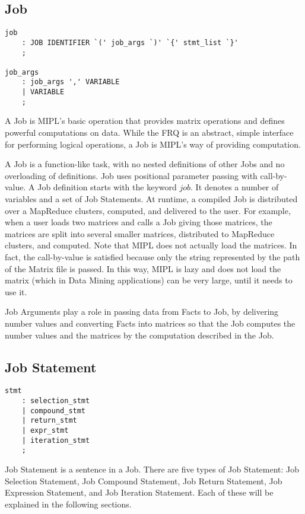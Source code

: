 \documentclass[prodmode,acmtecs]{acmsmall}
\begin{document}
\subsection{Job}

\begin{lstlisting}
job
	: JOB IDENTIFIER `(' job_args `)' `{' stmt_list `}'
	;

job_args
	: job_args ',' VARIABLE
	| VARIABLE
	;
\end{lstlisting}

\label{Job_Section}
A Job is MIPL's basic operation that provides matrix operations and 
defines powerful computations on data. While the FRQ is an abstract,
simple interface for performing logical operations, a Job is MIPL's 
way of providing computation.

A Job is a function-like task, with no nested definitions of other Jobs and no
overloading of definitions. Job uses 
positional parameter passing with call-by-value.  A Job
definition starts with the keyword $job$. It denotes a number of variables and a set of Job
Statements.  At runtime, a compiled Job is distributed over
a MapReduce clusters, computed, and delivered to the user. For
example, when a user loads two matrices and calls a Job giving those
matrices, the matrices are split into several smaller matrices,
distributed to MapReduce clusters, and computed. Note that MIPL does not
actually load the matrices. In fact, the call-by-value is satisfied because 
only the string represented by the path of the Matrix file is passed. In this 
way, MIPL is lazy and does not load the matrix (which in Data Mining applications) 
can be very large, until it needs to use it.

Job Arguments play a role in passing data from Facts to Job, by
delivering number values and converting Facts into matrices
so that the Job computes the number values and the matrices by
the computation described in the Job.
\medskip

\subsection{Job Statement}

\begin{lstlisting}
stmt
	: selection_stmt
	| compound_stmt
	| return_stmt
	| expr_stmt
	| iteration_stmt
	;
\end{lstlisting}

Job Statement is a sentence in a Job.  There are five types of
Job Statement: Job Selection Statement, Job Compound Statement,
Job Return Statement, Job Expression Statement, and Job Iteration
Statement.  Each of these will be explained in the following
sections.
\medskip
\end{document}

